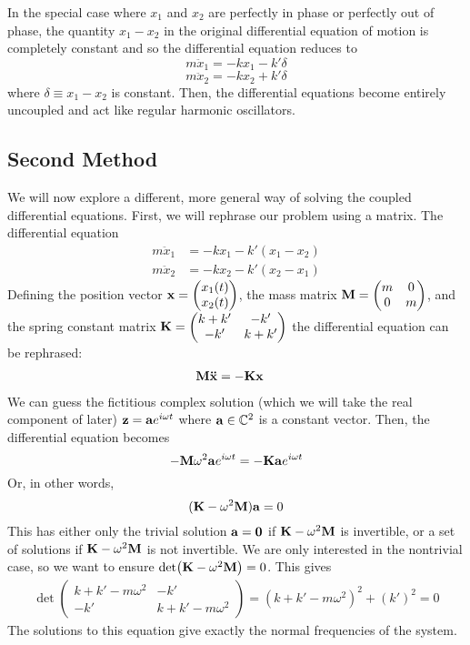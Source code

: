 In the special case where $x_1$ and $x_2$ are perfectly in phase or perfectly out of phase, the quantity $x_1-x_2$ in the original differential equation of motion is completely constant and so the differential equation reduces to
\[ m\ddot x_1 = -kx_1 - k'\delta \]
\[ m\ddot x_2 = -kx_2 + k'\delta \]
where $\delta \equiv x_1-x_2$ is constant. Then, the differential equations become entirely uncoupled and act like regular harmonic oscillators. 
\subsection*{Second Method}
We will now explore a different, more general way of solving the coupled differential equations. First, we will rephrase our problem using a matrix. The differential equation
\begin{align*}
    m\ddot x_1 &=-kx_1 -k'(x_1-x_2) \\
    m\ddot x_2 &= -kx_2 - k'(x_2-x_1)
\end{align*}
Defining the position vector $\mathbf{x} = \begin{pmatrix}
    x_1(t) \\ x_2(t)
\end{pmatrix}$, the mass matrix $\mathbf{M} = \begin{pmatrix}
    m & 0 \\
    0 & m
\end{pmatrix}$, and the spring constant matrix $\mathbf{K} = \begin{pmatrix}
    k+k'  & -k' \\
    -k' & k+k'
\end{pmatrix}$ the differential equation can be rephrased:
\begin{align*}
    \mathbf{M} \mathbf{\ddot x} &= -\mathbf{K} \mathbf{x}
\end{align*}
We can guess the fictitious complex solution (which we will take the real component of later) $\mathbf{z} = \mathbf{a} e^{i\omega t}$ where $\mathbf{a}\in\mathbb{C}^2$ is a constant vector. Then, the differential equation becomes
\[ -\mathbf{M} \omega^2 \mathbf{a} e^{i\omega t} = -\mathbf{K}\mathbf{a} e^{i\omega t}\]
Or, in other words,
\[ (\mathbf{K} -\omega^2 \mathbf{M})\mathbf{a} = 0\]
This has either only the trivial solution $\mathbf{a} =\mathbf{0}$ if $\mathbf{K} - \omega^2\mathbf{M}$ is invertible, or a set of solutions if $\mathbf{K} -\omega^2\mathbf{M}$ is not invertible. We are only interested in the nontrivial case, so we want to ensure $\det(\mathbf{K} -\omega^2\mathbf{M}) = 0$. This gives
\begin{align*}
    \det \begin{pmatrix}
        k+k'-m\omega ^2 & -k' \\
        -k' & k+k'-m\omega^2
    \end{pmatrix} = (k+k'-m\omega^2)^2 + (k')^2 = 0
\end{align*}
The solutions to this equation give exactly the normal frequencies of the system. 
